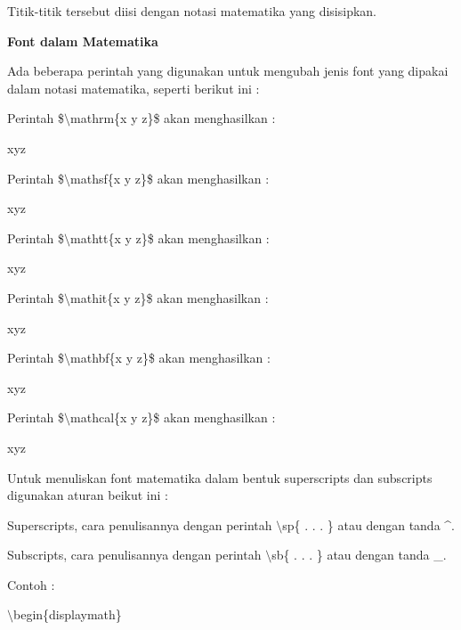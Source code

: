 Titik-titik tersebut diisi dengan notasi matematika yang disisipkan.
\par \vspace{12pt}
\textbf{Font dalam Matematika}
\par \vspace{12pt}
Ada beberapa perintah yang digunakan untuk mengubah jenis font yang dipakai dalam notasi matematika, seperti berikut ini :
\par \vspace{12pt}
Perintah \$$\setminus$mathrm\{x y z\}\$ 
akan menghasilkan :

xyz
\par \vspace{12pt}
Perintah \$$\setminus$mathsf\{x y z\}\$ 
akan menghasilkan :

xyz
\par \vspace{12pt}
Perintah \$$\setminus$mathtt\{x y z\}\$ 
akan menghasilkan :

xyz
\par \vspace{12pt}
Perintah \$$\setminus$mathit\{x y z\}\$ 
akan menghasilkan :

xyz\par \vspace{12pt}



Perintah \$$\setminus$mathbf\{x y z\}\$ 
akan menghasilkan :

xyz
\par \vspace{12pt}
Perintah \$$\setminus$mathcal\{x y z\}\$ 
akan menghasilkan :

xyz
\par \vspace{12pt}
Untuk menuliskan font matematika dalam bentuk superscripts dan 
subscripts digunakan aturan beikut ini :\par \vspace{12pt}

Superscripts, cara penulisannya dengan perintah $\setminus$sp\{ . . . 
\} atau dengan tanda \^{}.
\par \vspace{12pt}
Subscripts, cara penulisannya dengan perintah $\setminus$sb\{ . . . \} 
atau dengan tanda \_.
\par \vspace{12pt}
Contoh :
\par \vspace{12pt}
$\setminus$begin\{displaymath\}
\par \vspace{12pt}

